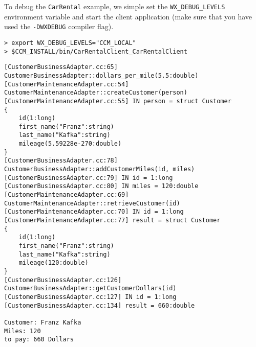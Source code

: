 To debug the {\tt CarRental} example, we simple set the {\tt WX\_DEBUG\_LEVELS}
environment variable and start the client application 
(make sure that you have used the {\tt -DWXDEBUG} compiler flag).

\begin{verbatim} 
> export WX_DEBUG_LEVELS="CCM_LOCAL"
> $CCM_INSTALL/bin/CarRentalClient_CarRentalClient
\end{verbatim} 

\begin{footnotesize}
\begin{verbatim} 
[CustomerBusinessAdapter.cc:65]  CustomerBusinessAdapter::dollars_per_mile(5.5:double)
[CustomerMaintenanceAdapter.cc:54]  CustomerMaintenanceAdapter::createCustomer(person)
[CustomerMaintenanceAdapter.cc:55] IN person = struct Customer
{
    id(1:long)
    first_name("Franz":string)
    last_name("Kafka":string)
    mileage(5.59228e-270:double)
}
[CustomerBusinessAdapter.cc:78]  CustomerBusinessAdapter::addCustomerMiles(id, miles)
[CustomerBusinessAdapter.cc:79] IN id = 1:long
[CustomerBusinessAdapter.cc:80] IN miles = 120:double
[CustomerMaintenanceAdapter.cc:69]  CustomerMaintenanceAdapter::retrieveCustomer(id)
[CustomerMaintenanceAdapter.cc:70] IN id = 1:long
[CustomerMaintenanceAdapter.cc:77] result = struct Customer
{
    id(1:long)
    first_name("Franz":string)
    last_name("Kafka":string)
    mileage(120:double)
}
[CustomerBusinessAdapter.cc:126]  CustomerBusinessAdapter::getCustomerDollars(id)
[CustomerBusinessAdapter.cc:127] IN id = 1:long
[CustomerBusinessAdapter.cc:134] result = 660:double

Customer: Franz Kafka
Miles: 120
to pay: 660 Dollars
\end{verbatim} 
\end{footnotesize}
